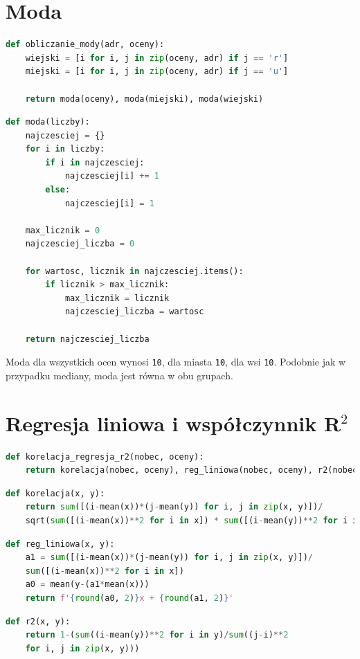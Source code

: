 \documentclass{article}
\begin{document}
\section{Moda}
\begin{lstlisting}[language=Python]
def obliczanie_mody(adr, oceny):
    wiejski = [i for i, j in zip(oceny, adr) if j == 'r']
    miejski = [i for i, j in zip(oceny, adr) if j == 'u']
    
    return moda(oceny), moda(miejski), moda(wiejski)
\end{lstlisting}
\begin{lstlisting}[language=Python]
def moda(liczby):
    najczesciej = {}
    for i in liczby:
        if i in najczesciej:
            najczesciej[i] += 1
        else:
            najczesciej[i] = 1
            
    max_licznik = 0
    najczesciej_liczba = 0
    
    for wartosc, licznik in najczesciej.items():
        if licznik > max_licznik:
            max_licznik = licznik
            najczesciej_liczba = wartosc
    
    return najczesciej_liczba
\end{lstlisting}

\begin{flushleft}
Moda dla wszystkich ocen wynosi \texttt{10}, dla miasta \texttt{10}, dla wsi \texttt{10}. Podobnie jak w przypadku mediany, moda jest równa w obu grupach.
\end{flushleft}
\vspace{2cm}

\section{Regresja liniowa i współczynnik R$^2$}
\begin{lstlisting}[language=Python]
def korelacja_regresja_r2(nobec, oceny):
    return korelacja(nobec, oceny), reg_liniowa(nobec, oceny), r2(nobec, oceny)
\end{lstlisting}
\begin{lstlisting}[language=Python]
def korelacja(x, y):
    return sum([(i-mean(x))*(j-mean(y)) for i, j in zip(x, y)])/
    sqrt(sum([(i-mean(x))**2 for i in x]) * sum([(i-mean(y))**2 for i in y]))
\end{lstlisting}
\begin{lstlisting}[language=Python]
def reg_liniowa(x, y):
    a1 = sum([(i-mean(x))*(j-mean(y)) for i, j in zip(x, y)])/
    sum([(i-mean(x))**2 for i in x])
    a0 = mean(y-(a1*mean(x)))
    return f'{round(a0, 2)}x + {round(a1, 2)}'
\end{lstlisting}
\begin{lstlisting}[language=Python]
def r2(x, y):
    return 1-(sum((i-mean(y))**2 for i in y)/sum((j-i)**2
    for i, j in zip(x, y)))
\end{lstlisting}
\end{document}

